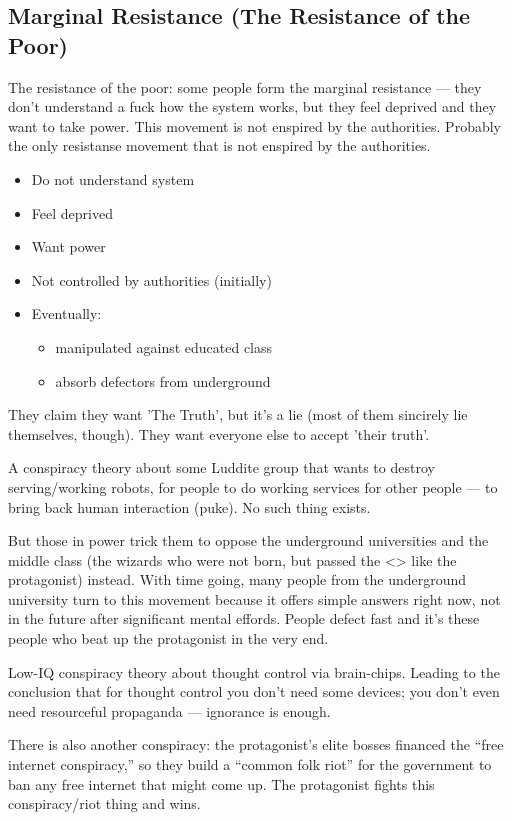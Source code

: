\documentclass[12pt]{article}
\begin{document}
\subsection{Marginal Resistance (The Resistance of the Poor)}

The resistance of the poor: some people form the marginal resistance — they don’t understand a fuck how the system works, but they feel deprived and they want to take power. This movement is not enspired by the authorities. Probably the only resistanse movement that is not enspired by the authorities.

\begin{itemize}
  \item Do not understand system
  \item Feel deprived
  \item Want power
  \item Not controlled by authorities (initially)
  \item Eventually:
  \begin{itemize}
    \item manipulated against educated class
    \item absorb defectors from underground
  \end{itemize}
\end{itemize}

They claim they want 'The Truth', but it's a lie (most of them sincirely lie themselves, though). They want everyone else to accept 'their truth'.

A conspiracy theory about some Luddite group that wants to destroy serving/working robots, for people to do working services for other people — to bring back human interaction (puke). No such thing exists.

But those in power trick them to oppose the underground universities and the middle class (the wizards who were not born, but passed the \textless{}\textgreater{} like the protagonist) instead. With time going, many people from the underground university turn to this movement because it offers simple answers right now, not in the future after significant mental effords. People defect fast and it’s these people who beat up the protagonist in the very end.

Low-IQ conspiracy theory about thought control via brain-chips. Leading to the conclusion that for thought control you don’t need some devices; you don’t even need resourceful propaganda — ignorance is enough.

There is also another conspiracy: the protagonist’s elite bosses financed the “free internet conspiracy,” so they build a “common folk riot” for the government to ban any free internet that might come up. The protagonist fights this conspiracy/riot thing and wins.
\end{document}
